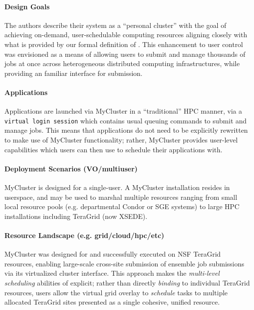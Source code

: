 \documentclass{sig-alternate}
\begin{document}
\paragraph{Design Goals}
The authors describe their system
as a ``personal cluster'' with the goal of achieving on-demand,
user-schedulable computing resources aligning closely with what is
provided by our formal definition of \pilotjobs.  This enhancement
to user control was envisioned as a means of allowing
users to submit and manage thousands of jobs at once
across heterogeneous distributed computing infrastructures, while
providing an familiar interface for submission.

\paragraph{Applications}
Applications are launched via MyCluster in a ``traditional''
HPC manner, via a \texttt{virtual
login session} which contains usual queuing commands to submit
and manage jobs.  This means that applications do not need
to be explicitly rewritten to make use of MyCluster functionality;
rather, MyCluster provides user-level \pilotjob capabilities
which users can then use to schedule their applications with.

\paragraph{Deployment Scenarios (VO/multiuser)}
MyCluster is designed for a single-user.  A MyCluster
installation resides in userspace, and may be used
to marshal multiple resources ranging from small local resource pools
(e.g. departmental Condor or SGE systems) to large HPC installations
including TeraGrid (now XSEDE).

\paragraph{Resource Landscape (e.g. grid/cloud/hpc/etc)}
MyCluster was designed for and successfully executed on NSF TeraGrid
resources, enabling large-scale cross-site submission of ensemble
job submissions via its virtualized cluster interface.
This approach makes the \textit{multi-level scheduling} abilities
of \pilotjobs explicit; rather than directly \textit{binding}
to individual TeraGrid resources, users allow the virtual grid
overlay to \textit{schedule} tasks to multiple allocated TeraGrid sites
presented as a single cohesive, unified resource.
\end{document}
